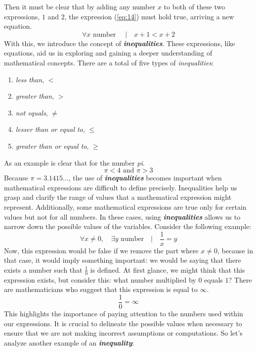 Then it must be clear that by adding any number $x$ to both of these two expressions, $1$ and $2$, the expression (\ref{eq:14}) must hold true, arriving a new equation.
\begin{equation} \label{eq:15}
  \forall x \text{ number } \quad |\quad x + 1 < x + 2
\end{equation}
With this, we introduce the concept of \textit{\textbf{inequalities}}. These expressions, like equations, aid us in exploring and gaining a deeper understanding of mathematical concepts. There are a total of five types of \textit{inequalities}:
\begin{center}
  \begin{varwidth}{\textwidth}    
    \begin{enumerate}[label=(\Roman*)]
    \item \textit{less than}, $<$
    \item \textit{greater than}, $>$
    \item \textit{not equals}, $\neq$
    \item \textit{lesser than or equal to}, $\leq$
    \item \textit{greater than or equal to}, $\geq$
    \end{enumerate}
  \end{varwidth}
\end{center}
As an example is clear that for the number \textit{pi}.
\[
  \pi < 4 \text{ and } \pi > 3
\]
Because $\pi = 3.1415\ldots$, the use of \textit{\textbf{inequalities}} becomes important when mathematical expressions are difficult to define precisely. Inequalities help us grasp and clarify the range of values that a mathematical expression might represent. Additionally, some mathematical expressions are true only for certain values but not for all numbers. In these cases, using \textit{\textbf{inequalities}} allows us to narrow down the possible values of the variables. Consider the following example:
\[
  \forall x \neq 0,\quad \exists y \text{ number}\quad |\quad \frac{1}{x} = y
\]
Now, this expression would be false if we remove the part where $x \neq 0$, because in that case, it would imply something important: we would be saying that there exists a number such that $\frac{1}{0}$ is defined. At first glance, we might think that this expression exists, but consider this: what number multiplied by $0$ equals $1$? There are mathematicians who suggest that this expression is equal to $\infty$.
\[
  \frac{1}{0} = \infty
\]
This highlights the importance of paying attention to the numbers used within our expressions. It is crucial to delineate the possible values when necessary to ensure that we are not making incorrect assumptions or computations. So let's analyze another example of an \textit{\textbf{inequality}}:
